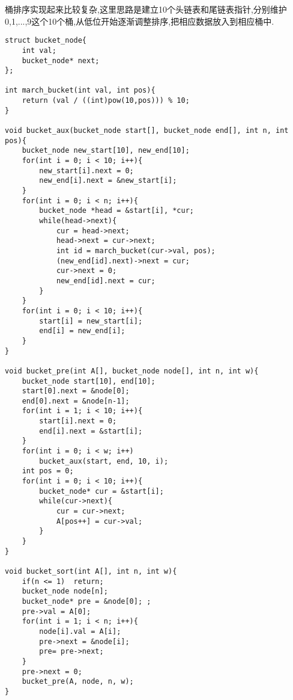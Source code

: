 \qquad 桶排序实现起来比较复杂,这里思路是建立10个头链表和尾链表指针,分别维护0,1,...,9这个10个桶,从低位开始逐渐调整排序,把相应数据放入到相应桶中.    
\begin{lstlisting}
struct bucket_node{
	int val;
	bucket_node* next;
};

int march_bucket(int val, int pos){
	return (val / ((int)pow(10,pos))) % 10;
}

void bucket_aux(bucket_node start[], bucket_node end[], int n, int pos){
	bucket_node new_start[10], new_end[10];
	for(int i = 0; i < 10; i++){
		new_start[i].next = 0;
		new_end[i].next = &new_start[i];
	}
	for(int i = 0; i < n; i++){
		bucket_node *head = &start[i], *cur;
		while(head->next){
			cur = head->next;
			head->next = cur->next;
			int id = march_bucket(cur->val, pos);
			(new_end[id].next)->next = cur;
			cur->next = 0;
			new_end[id].next = cur;
		}
	}
	for(int i = 0; i < 10; i++){
		start[i] = new_start[i];
		end[i] = new_end[i];
	}
}

void bucket_pre(int A[], bucket_node node[], int n, int w){
	bucket_node start[10], end[10];
	start[0].next = &node[0];
	end[0].next = &node[n-1];
	for(int i = 1; i < 10; i++){
		start[i].next = 0;
		end[i].next = &start[i];
	}
	for(int i = 0; i < w; i++)
		bucket_aux(start, end, 10, i);
	int pos = 0;
	for(int i = 0; i < 10; i++){
		bucket_node* cur = &start[i];
		while(cur->next){
			cur = cur->next;
			A[pos++] = cur->val;
		}
	}
}

void bucket_sort(int A[], int n, int w){
	if(n <= 1)	return;
	bucket_node node[n];
	bucket_node* pre = &node[0]; ;
	pre->val = A[0];
	for(int i = 1; i < n; i++){
		node[i].val = A[i];
		pre->next = &node[i];
		pre= pre->next;
	}
	pre->next = 0;
	bucket_pre(A, node, n, w);
}
\end{lstlisting}
